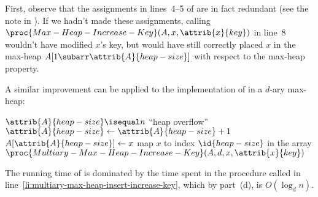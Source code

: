 First, observe that the assignments in lines~4--5 of  are in fact redundant (see the note in ).
If we hadn't made these assignments, calling $\proc{Max-Heap-Increase-Key}(A,x,\attrib{x}{key})$ in line~8 wouldn't have modified $x$'s key, but would have still correctly placed $x$ in the max-heap $A[1\subarr\attrib{A}{heap-size}]$ with respect to the max-heap property.

A similar improvement can be applied to the implementation of  in a $d$-ary max-heap:

\begin{codebox}
\li \If $\attrib{A}{heap-size}\isequal n$
\li     \Then \Error ``heap overflow''
        \End
\li $\attrib{A}{heap-size}\gets\attrib{A}{heap-size}+1$
\li $A[\attrib{A}{heap-size}]\gets x$
\li map $x$ to index $\id{heap-size}$ in the array
\li $\proc{Multiary-Max-Heap-Increase-Key}(A,d,x,\attrib{x}{key})$ \label{li:multiary-max-heap-insert-increase-key}
\end{codebox}

The running time of  is dominated by the time spent in the  procedure called in line~\ref{li:multiary-max-heap-insert-increase-key}, which by part~(d), is $O(\log_dn)$.
